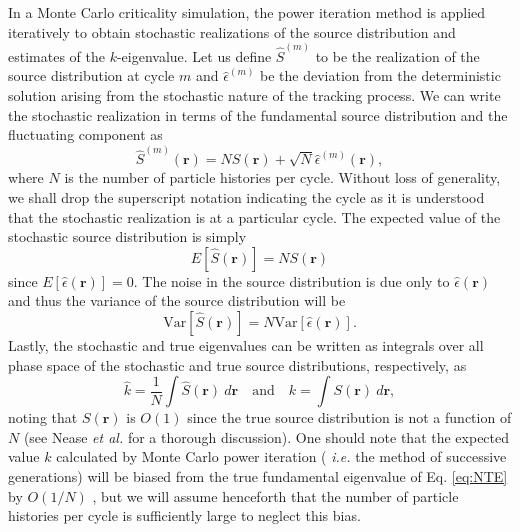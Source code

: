 In a Monte Carlo criticality simulation, the power iteration method is
applied iteratively to obtain stochastic realizations of the source
distribution and estimates of the $k$-eigenvalue. Let us define
$\hat{S}^{(m)}$ to be the realization of the source distribution at
cycle $m$ and $\hat{\epsilon}^{(m)}$ be the deviation from the
deterministic solution arising from the stochastic nature of the
tracking process. We can write the stochastic realization in terms of
the fundamental source distribution and the fluctuating component as
\cite{brissenden}
\begin{equation}\label{eq:source}
  \hat{S}^{(m)}(\mathbf{r})= N S(\mathbf{r}) + \sqrt{N}
  \hat{\epsilon}^{(m)}(\mathbf{r}),
\end{equation}
where $N$ is the number of particle histories per cycle. Without loss
of generality, we shall drop the superscript notation indicating the
cycle as it is understood that the stochastic realization is at a
particular cycle. The expected value of the stochastic source
distribution is simply
\begin{equation}
  E \left[ \hat{S}(\mathbf{r})\right] = N S (\mathbf{r})
\end{equation}
since $E \left[ \hat{\epsilon}(\mathbf{r})\right] = 0$. The noise in
the source distribution is due only to $\hat{\epsilon}(\mathbf{r})$
and thus the variance of the source distribution will be
\begin{equation}
  \text{Var} \left[ \hat{S}(\mathbf{r})\right] = N \text{Var} \left[
    \hat{\epsilon}(\mathbf{r}) \right].
\end{equation}
Lastly, the stochastic and true eigenvalues can be written as
integrals over all phase space of the stochastic and true source
distributions, respectively, as
\begin{equation}\label{eq:k_to_source}
  \hat{k} = \frac{1}{N} \int \hat{S}(\mathbf{r}) \: d\mathbf{r} \quad
  \text{and} \quad k = \int S(\mathbf{r}) \: d\mathbf{r},
\end{equation}
noting that $S(\mathbf{r})$ is $O(1)$ since the true source
distribution is not a function of $N$ (see Nease {\em et al.}
\cite{nease} for a thorough discussion). One should note that the
expected value $k$ calculated by Monte Carlo power iteration ({\em
  i.e.} the method of successive generations) will be biased from the
true fundamental eigenvalue of Eq. \ref{eq:NTE} by $O(1/N)$
\cite{brissenden}, but we will assume henceforth that the number of
particle histories per cycle is sufficiently large to neglect this
bias.

